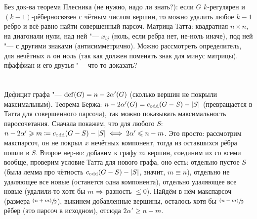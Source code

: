 	Без док-ва теорема Плесника (не нужно, \TODO надо ли знать?): если $G$ $k$-регулярен и $(k-1)$-рёберносвязен с чётным числом вершин,
	то можно удалить любое $k-1$ ребро и всё равно найти совершенный парсоч.
	Матрица Татта: квадратная $n \times n$, на диагонали нули, над ней "--- $x_{ij}$ (ноль, если ребра нет, не-ноль иначе),
	под ней "--- с другими знаками (антисимметрично).
	Можно рассмотреть определитель, для нечётных $n$ он ноль (так как должен поменять знак для минус матрицы).
	\TODO пфаффиан и его друзья "--- что-то доказать?

\section{} %
	Дефицит графа "--- $\mathrm{def}(G) = n-2\alpha'(G)$ (сколько вершин не покрыли максимальным).
	Теорема Бержа: $n-2\alpha'(G)=c_{\mathrm{odd}}(G-S) - |S|$ (превращается в Татта для совершенного парсоча),
	так можно показывать максимальность паросочетания.
	Сначала покажем, что для любого $S$: $n-2\alpha' \geqslant m \coloneq c_{\mathrm{odd}}(G-S)-|S| \iff 2\alpha' \leqslant n-m$.
	Это просто: рассмотрим макспарсоч, он не покрыл $x$ нечётных компонент, тогда из оставшихся рёбра пошли в $S$.
	Второе нер-во: добавим к графу $m$ вершин, соединим их со всеми вообще, проверим условие Татта для нового графа, оно есть:
	отдельно пустое $S$ (была лемма про чётность $c_{\mathrm{odd}}(G-S)-|S|$, значит, $m \equiv n$),
	отдельно не удаляющее все новые (останется одна компонента),
	отдельно удаляющее все новые (удалили-то хотя бы $m$ $\Rightarrow$ разность $\le 0$).
	Найдём в нём макспарсоч (размера $\sfrac{(n+m)}{2}$), выкинем добавленные вершины, осталось хотя бы $\sfrac{(n-m)}{2}$ рёбер (это парсоч в исходном),
	отсюда $2\alpha' \ge n-m$.
